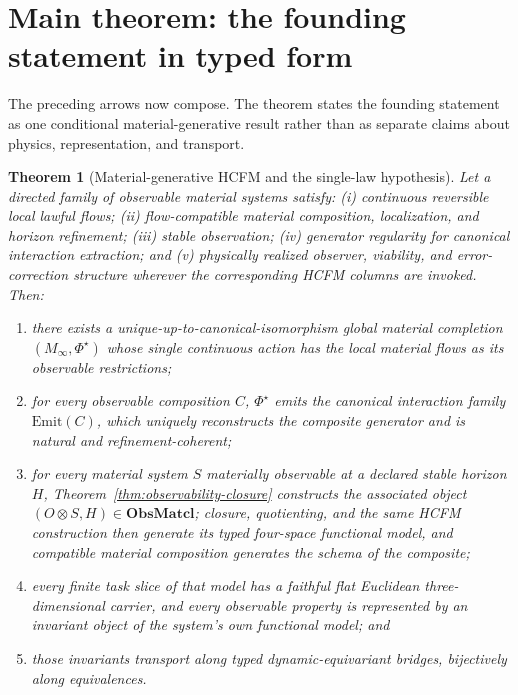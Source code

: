 \documentclass[11pt]{article}
\newtheorem{theorem}{Theorem}
\theoremstyle{definition}
\newcommand{\ObsMatcl}{\mathbf{ObsMatcl}}
\newcommand{\Minf}{M_\infty}
\begin{document}
\section{Main theorem: the founding statement in typed form}

The preceding arrows now compose. The theorem states the founding statement as one conditional material-generative result rather than as separate claims about physics, representation, and transport.

\begin{theorem}[Material-generative HCFM and the single-law hypothesis]
\label{thm:main-material-generative-hcfm}
Let a directed family of observable material systems satisfy: (i) continuous reversible local lawful flows; (ii) flow-compatible material composition, localization, and horizon refinement; (iii) stable observation; (iv) generator regularity for canonical interaction extraction; and (v) physically realized observer, viability, and error-correction structure wherever the corresponding HCFM columns are invoked. Then:
\begin{enumerate}[label=\arabic*.]
\item there exists a unique-up-to-canonical-isomorphism global material completion $(\Minf, \Phi^{\star})$ whose single continuous action has the local material flows as its observable restrictions;
\item for every observable composition $C$, $\Phi^{\star}$ emits the canonical interaction family $\mathrm{Emit}(C)$, which uniquely reconstructs the composite generator and is natural and refinement-coherent;
\item for every material system \(S\) materially observable at a declared stable horizon \(H\), Theorem~\ref{thm:observability-closure} constructs the associated object \((O\otimes S,H)\in\ObsMatcl\); closure, quotienting, and the same HCFM construction then generate its typed four-space functional model, and compatible material composition generates the schema of the composite;
\item every finite task slice of that model has a faithful flat Euclidean three-dimensional carrier, and every observable property is represented by an invariant object of the system's own functional model; and
\item those invariants transport along typed dynamic-equivariant bridges, bijectively along equivalences.
\end{enumerate}
\end{theorem}
\end{document}
